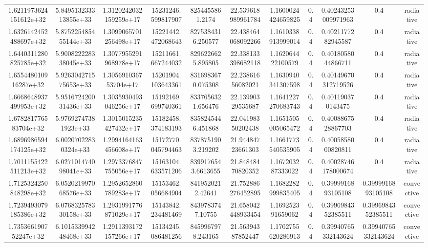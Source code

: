 \begin{table}
\begin{tabular}{ccccccccccc}
1.6211973624151612e+32 & 5.849513233313855e+33 & 1.3120242032159259e+17 & 15231246.599817907 & 8254455861.2174 & 22.539618989961784 & 1.1600024424659825 & 0.4 & 0.40243253009971963 & 0.4 & radiative \\
1.6326142452488697e+32 & 5.875225485455144e+33 & 1.3099065701256498e+17 & 15221442.472068643 & 8275384316.250577 & 22.438464068092266 & 1.1610338913999014 & 0.4 & 0.4021177282945587 & 0.4 & radiative \\
1.6440311280825785e+32 & 5.900822228338045e+33 & 1.3077955291968978e+17 & 15211661.667244032 & 8296226625.895805 & 22.338133398682118 & 1.162064422100579 & 0.4 & 0.4018058044866711 & 0.4 & radiative \\
1.655448010916287e+32 & 5.926304271575653e+33 & 1.305691036753704e+17 & 15201904.103643361 & 8316983670.075308 & 22.23861656082021 & 1.1630940341307598 & 0.4 & 0.40149670312719526 & 0.4 & radiative \\
1.6668648937499953e+32 & 5.951672420031436e+33 & 1.3035930493046256e+17 & 15192169.699740361 & 8337656321.656476 & 22.13990329535687 & 1.1641227270683743 & 0.4 & 0.401190370143475 & 0.4 & radiative \\
1.678281776583704e+32 & 5.97692747381923e+33 & 1.3015015235427432e+17 & 15182458.374183193 & 8358245446.451868 & 22.04198350202438 & 1.1651505005065472 & 0.4 & 0.4008867528867703 & 0.4 & radiative \\
1.6896986594174125e+32 & 6.00207022830324e+33 & 1.2994164163456608e+17 & 15172770.045794463 & 8378751903.219202 & 21.94484723661303 & 1.1661773540535905 & 0.4 & 0.4005858000820811 & 0.4 & radiative \\
1.7011155422511213e+32 & 6.027101474098041e+33 & 1.2973376847755056e+17 & 15163104.633571206 & 8399176543.6613655 & 21.84848470820352 & 1.167203287333022 & 0.4 & 0.40028746178000674 & 0.4 & radiative \\
1.7125324250848298e+32 & 6.052021997068576e+33 & 1.2952652860789283e+17 & 15153462.056684904 & 8419520212.42641 & 21.752886276452895 & 1.1682282999835405 & 0.4 & 0.3999916893105108 & 0.3999916893105108 & convective \\
1.7239493079185386e+32 & 6.076832578330158e+33 & 1.2931991776871029e+17 & 15143842.234481469 & 8439783747.10755 & 21.658042448933454 & 1.169252391659062 & 0.4 & 0.3996984352385511 & 0.3996984352385511 & convective \\
1.735366190752247e+32 & 6.101533994248468e+33 & 1.2911393172157266e+17 & 15134245.086481256 & 8459967978.243165 & 21.56394387852447 & 1.1702755620286913 & 0.4 & 0.39940765332143624 & 0.39940765332143624 & convective \\

\end{tabular}
\end{table}
